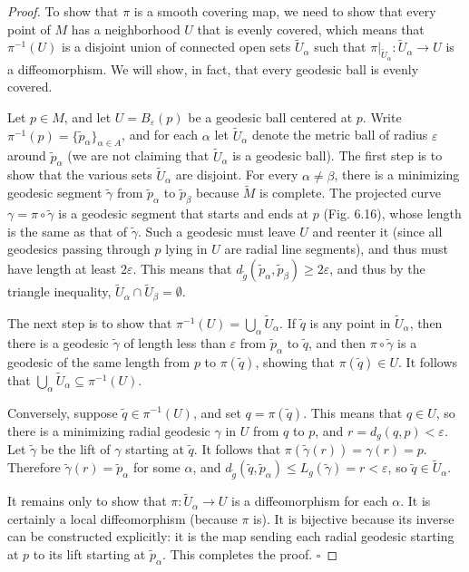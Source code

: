 \begin{proof}
To show that $\pi$ is a smooth covering map, we need to show that every point of $M$ has a neighborhood $U$ that is evenly covered, which means that $\pi^{-1}(U)$ is a disjoint union of connected open sets $\tilde{U}_\alpha$ such that $\pi|_{\tilde{U}_\alpha} : \tilde{U}_\alpha \to U$ is a diffeomorphism. We will show, in fact, that every geodesic ball is evenly covered.

Let $p \in M$, and let $U = B_\varepsilon(p)$ be a geodesic ball centered at $p$. Write $\pi^{-1}(p) = \{\tilde{p}_\alpha\}_{\alpha \in A}$, and for each $\alpha$ let $\tilde{U}_\alpha$ denote the metric ball of radius $\varepsilon$ around $\tilde{p}_\alpha$ (we are not claiming that $\tilde{U}_\alpha$ is a geodesic ball). The first step is to show that the various sets $\tilde{U}_\alpha$ are disjoint. For every $\alpha \neq \beta$, there is a minimizing geodesic segment $\tilde{\gamma}$ from $\tilde{p}_\alpha$ to $\tilde{p}_\beta$ because $\tilde{M}$ is complete. The projected curve $\gamma = \pi \circ \tilde{\gamma}$ is a geodesic segment that starts and ends at $p$ (Fig. 6.16), whose length is the same as that of $\tilde{\gamma}$. Such a geodesic must leave $U$ and reenter it (since all geodesics passing through $p$ lying in $U$ are radial line segments), and thus must have length at least $2\varepsilon$. This means that $d_{\tilde{g}}(\tilde{p}_\alpha, \tilde{p}_\beta) \geq 2\varepsilon$, and thus by the triangle inequality, $\tilde{U}_\alpha \cap \tilde{U}_\beta = \emptyset$.

The next step is to show that $\pi^{-1}(U) = \bigcup_\alpha \tilde{U}_\alpha$. If $\tilde{q}$ is any point in $\tilde{U}_\alpha$, then there is a geodesic $\tilde{\gamma}$ of length less than $\varepsilon$ from $\tilde{p}_\alpha$ to $\tilde{q}$, and then $\pi \circ \tilde{\gamma}$ is a geodesic of the same length from $p$ to $\pi(\tilde{q})$, showing that $\pi(\tilde{q}) \in U$. It follows that $\bigcup_\alpha \tilde{U}_\alpha \subseteq \pi^{-1}(U)$.


Conversely, suppose $\tilde{q} \in \pi^{-1}(U)$, and set $q = \pi(\tilde{q})$. This means that $q \in U$, so there is a minimizing radial geodesic $\gamma$ in $U$ from $q$ to $p$, and $r = d_g(q, p) < \varepsilon$. Let $\tilde{\gamma}$ be the lift of $\gamma$ starting at $\tilde{q}$. It follows that $\pi(\tilde{\gamma}(r)) = \gamma(r) = p$. Therefore $\tilde{\gamma}(r) = \tilde{p}_\alpha$ for some $\alpha$, and $d_{\tilde{g}}(\tilde{q}, \tilde{p}_\alpha) \le L_g(\tilde{\gamma}) = r < \varepsilon$, so $\tilde{q} \in \tilde{U}_\alpha$.

It remains only to show that $\pi: \tilde{U}_\alpha \to U$ is a diffeomorphism for each $\alpha$. It is certainly a local diffeomorphism (because $\pi$ is). It is bijective because its inverse can be constructed explicitly: it is the map sending each radial geodesic starting at $p$ to its lift starting at $\tilde{p}_\alpha$. This completes the proof. $\square$
\end{proof}

